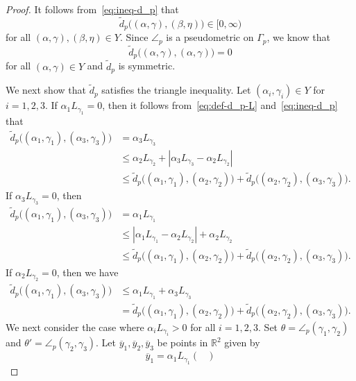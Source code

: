 \documentclass[10pt,a4paper]{amsart}
\def\R{\mathbb R}
\providecommand{\abs}[1]{\left\lvert#1\right\rvert}
\begin{document}
\begin{proof}
 It follows from~\eqref{eq:ineq-d_p} that 
 \[
  \tilde{d}_p\bigl((\alpha, \gamma), (\beta, \eta)\bigr)\in [0,\infty)
 \]
 for all $(\alpha, \gamma), (\beta, \eta)\in Y$. 
 Since $\angle_p$ is a pseudometric on $\Gamma_p$, 
 we know that 
 \[
  \tilde{d}_p\bigl((\alpha, \gamma), (\alpha, \gamma)\bigr) =0
 \]
 for all $(\alpha, \gamma)\in Y$ and 
 $\tilde{d}_p$ is symmetric. 
 
 We next show that $\tilde{d}_p$ satisfies the triangle 
 inequality. Let $(\alpha_i, \gamma_i) \in Y$ 
 for $i=1,2,3$. 
 If $\alpha_1 L_{\gamma_1}=0$, 
 then it follows from~\eqref{eq:def-d_p-L} and~\eqref{eq:ineq-d_p} that 
 \begin{align*}
  \tilde{d}_p\bigl((\alpha_1, \gamma_1), (\alpha_3, \gamma_3)\bigr) 
  &=\alpha_3 L_{\gamma_3} \\
  &\leq \alpha_2 L_{\gamma_2} + \abs{\alpha_3 L_{\gamma_3} - \alpha_2 L_{\gamma_2}} \\
  &\leq 
   \tilde{d}_p\bigl((\alpha_1, \gamma_1), (\alpha_2, \gamma_2)\bigr) 
  +
  \tilde{d}_p\bigl((\alpha_2, \gamma_2), (\alpha_3, \gamma_3)\bigr). 
 \end{align*}
 If $\alpha_3 L_{\gamma_3}=0$, then 
 \begin{align*}
  \tilde{d}_p\bigl((\alpha_1, \gamma_1), (\alpha_3, \gamma_3)\bigr) 
  &=\alpha_1 L_{\gamma_1} \\
  &\leq \abs{\alpha_1 L_{\gamma_1} - \alpha_2 L_{\gamma_2}} + \alpha_2 L_{\gamma_2} \\
  &\leq 
   \tilde{d}_p\bigl((\alpha_1, \gamma_1), (\alpha_2, \gamma_2)\bigr) 
  +
  \tilde{d}_p\bigl((\alpha_2, \gamma_2), (\alpha_3, \gamma_3)\bigr). 
 \end{align*}
 If $\alpha_2 L_{\gamma_2} =0$, then we have 
 \begin{align*}
  \tilde{d}_p\bigl((\alpha_1, \gamma_1), (\alpha_3, \gamma_3)\bigr) 
  &\leq \alpha_1 L_{\gamma_1} + \alpha_3 L_{\gamma_3} \\
  &=
   \tilde{d}_p\bigl((\alpha_1, \gamma_1), (\alpha_2, \gamma_2)\bigr) 
  +
  \tilde{d}_p\bigl((\alpha_2, \gamma_2), (\alpha_3, \gamma_3)\bigr). 
 \end{align*}
 We next consider the case where $\alpha_i L_{\gamma_i} >0$ 
 for all $i=1,2,3$. Set $\theta=\angle_p(\gamma_1, \gamma_2)$ 
 and $\theta'=\angle_p(\gamma_2, \gamma_3)$. 
 Let $\overline{y}_1, \overline{y}_2, \overline{y}_3$ 
 be points in $\R^2$ given by 
 \[
  \overline{y}_1 = 
   \alpha_1 L_{\gamma_1}
  \begin{pmatrix}

\end{pmatrix}\]
\end{proof}
\end{document}
